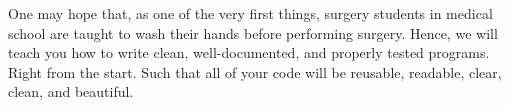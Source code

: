 One may  hope that, as one of the very first things, surgery students in medical school are taught to wash their hands before performing surgery.
Hence, we will teach you how to write clean, well-documented, and properly tested programs.
Right from the start.
Such that all of your code will be reusable, readable, clear, clean, and beautiful.%
%
\endhsection\endhsection%
%
